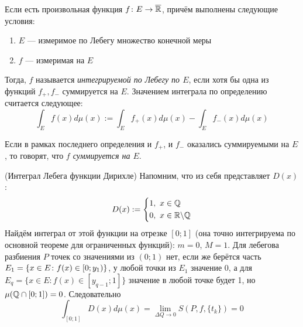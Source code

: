 \begin{definition}
	Если есть произвольная функция $f \colon E \to \overline{\mathbb{R}}$, причём выполнены следующие условия:
	\begin{enumerate}
		\item $E$ --- измеримое по Лебегу множество конечной меры
		
		\item $f$ --- измеримая на $E$
	\end{enumerate}
	Тогда, $f$ называется \textit{интегрируемой по Лебегу по $E$}, если хотя бы одна из функций $f_+, f_-$ суммируется на $E$. Значением интеграла по определению считается следующее:
	\[
		\int_E f(x)d\mu(x) := \int_E f_+(x)d\mu(x) - \int_E f_-(x)d\mu(x)
	\]
\end{definition}

\begin{definition}
	Если в рамках последнего определения и $f_+$, и $f_-$ оказались суммируемыми на $E$, то говорят, что \textit{$f$ суммируется на $E$}.
\end{definition}

\begin{example} (Интеграл Лебега функции Дирихле)
	Напомним, что из себя представляет $D(x)$:
	\[
		D(x) := \left\{\begin{aligned}
			&{1,\ x \in \mathbb{Q}}
			\\
			&{0,\ x \in \mathbb{R} \backslash \mathbb{Q}}
		\end{aligned}\right.
	\]
	Найдём интеграл от этой функции на отрезке $[0; 1]$ (она точно интегрируема по основной теореме для ограниченных функций): $m = 0$, $M = 1$. Для лебегова разбиения $P$ точек со значениями из $(0; 1)$ нет, если же берётся часть $E_1 = \{x \in E \colon f(x) \in \left[0; y_1\right)\}$, у любой точки из $E_1$ значение 0, а для $E_q = \{x \in E \colon f(x) \in [y_{q - 1}; 1]\}$ значение в любой точке будет 1, но $\mu(\mathbb{Q} \cap [0; 1]) = 0$. Следовательно
	\[
		\int_{[0; 1]} D(x)d\mu(x) = \lim_{\Delta Q \to 0} S(P, f, \{t_k\}) = 0
	\]
\end{example}
